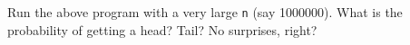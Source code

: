 Run the above program with a very large \verb!n! (say 1000000).
What is the probability of getting a head? Tail?
No surprises, right?
